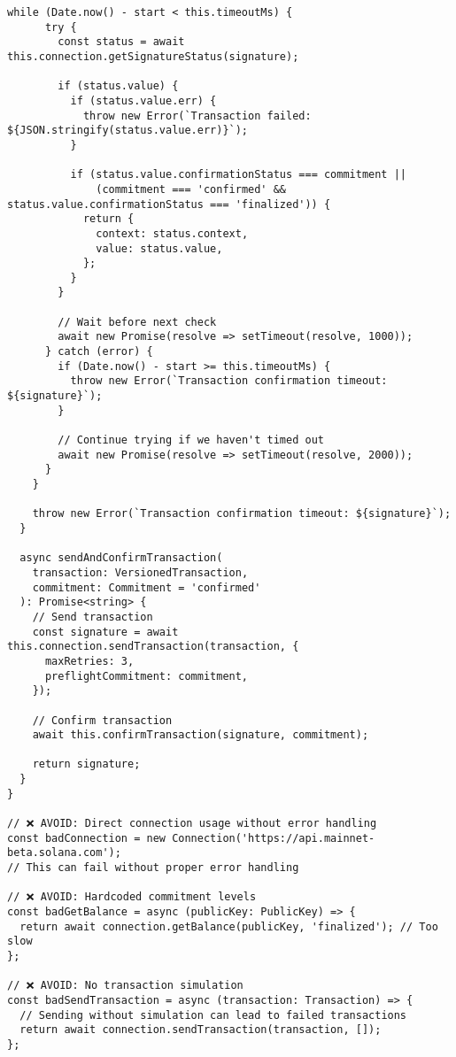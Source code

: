 \documentclass[11pt,a4paper]{article}
\begin{document}
\begin{lstlisting}[style=typescript, caption=Solana Web3.js Standards]
    while (Date.now() - start < this.timeoutMs) {
      try {
        const status = await this.connection.getSignatureStatus(signature);
        
        if (status.value) {
          if (status.value.err) {
            throw new Error(`Transaction failed: ${JSON.stringify(status.value.err)}`);
          }
          
          if (status.value.confirmationStatus === commitment || 
              (commitment === 'confirmed' && status.value.confirmationStatus === 'finalized')) {
            return {
              context: status.context,
              value: status.value,
            };
          }
        }
        
        // Wait before next check
        await new Promise(resolve => setTimeout(resolve, 1000));
      } catch (error) {
        if (Date.now() - start >= this.timeoutMs) {
          throw new Error(`Transaction confirmation timeout: ${signature}`);
        }
        
        // Continue trying if we haven't timed out
        await new Promise(resolve => setTimeout(resolve, 2000));
      }
    }
    
    throw new Error(`Transaction confirmation timeout: ${signature}`);
  }
  
  async sendAndConfirmTransaction(
    transaction: VersionedTransaction,
    commitment: Commitment = 'confirmed'
  ): Promise<string> {
    // Send transaction
    const signature = await this.connection.sendTransaction(transaction, {
      maxRetries: 3,
      preflightCommitment: commitment,
    });
    
    // Confirm transaction
    await this.confirmTransaction(signature, commitment);
    
    return signature;
  }
}

// ❌ AVOID: Direct connection usage without error handling
const badConnection = new Connection('https://api.mainnet-beta.solana.com');
// This can fail without proper error handling

// ❌ AVOID: Hardcoded commitment levels
const badGetBalance = async (publicKey: PublicKey) => {
  return await connection.getBalance(publicKey, 'finalized'); // Too slow
};

// ❌ AVOID: No transaction simulation
const badSendTransaction = async (transaction: Transaction) => {
  // Sending without simulation can lead to failed transactions
  return await connection.sendTransaction(transaction, []);
};
\end{lstlisting}
\end{document}
